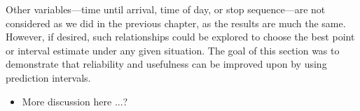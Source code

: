 Other variables---time until arrival, time of day, or stop sequence---are not considered as we did in the previous chapter, as the results are much the same. However, if desired, such relationships could be explored to choose the best point or interval estimate under any given situation. The goal of this section was to demonstrate that reliability and usefulness can be improved upon by using prediction intervals.

\begin{itemize}
\item More discussion here ...?
\end{itemize}

